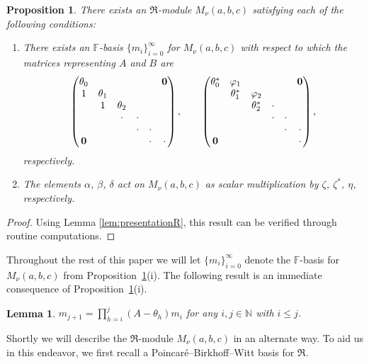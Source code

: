 \documentclass[11pt]{article}
\numberwithin{equation}{section}
\def\N{\mathbb N}
\def\F{\mathbb F}
\numberwithin{equation}{section}
\newtheorem{Lemma}[Theorem]{Lemma}
\newtheorem{Proposition}[Theorem]{Proposition}
 { \theoremstyle{definition}
\newtheorem{Definition}[Theorem]{Definition}
\newtheorem{Example}[Theorem]{Example} }
\begin{document}
\begin{Proposition}\label{prop:Verma}There exists an $\Re$-module $M_\nu (a,b,c)$ satisfying each of the following conditions:
\begin{enumerate}\itemsep=0pt
\item[{\rm (i)}] There exists an $\F$-basis $\{m_i\}_{i=0}^\infty$ for $M_\nu (a,b,c)$ with respect to which the matrices representing $A$ and $B$ are
\begin{gather*}
\begin{pmatrix}
\theta_0 & & & & &{\bf 0}
\\
1 &\theta_1
\\
&1 &\theta_2
 \\
 & &\cdot &\cdot
 \\
& & &\cdot &\cdot
 \\
 {\bf 0} & & & &\cdot &\cdot
\end{pmatrix},
\qquad
\begin{pmatrix}
\theta_0^* &\varphi_1 & & & &{\bf 0}
\\
 &\theta_1^* &\varphi_2
\\
 & &\theta_2^* &\cdot
 \\
 & & &\cdot &\cdot
 \\
& & & &\cdot &\cdot
 \\
 {\bf 0} & & & & &\cdot
\end{pmatrix},
\end{gather*}
respectively.

\item[{\rm (ii)}] The elements $\alpha$, $\beta$, $\delta$ act on $M_\nu (a,b,c)$ as scalar multiplication by $\zeta$, $\zeta^*$, $\eta$, respectively.
\end{enumerate}
\end{Proposition}
\begin{proof}Using Lemma \ref{lem:presentationR}, this result can be verified through routine computations.
\end{proof}

Throughout the rest of this paper we will let $\{m_i\}_{i=0}^\infty$ denote the $\F$-basis for $M_\nu(a,b,c)$ from Proposition~\ref{prop:Verma}(i). The following result is an immediate consequence of Proposition~\ref{prop:Verma}(i).

\begin{Lemma}\label{lem:mi}$m_{j+1}=\prod\limits_{h=i}^j (A-\theta_h)m_i$ for any $i,j\in \N$ with $ i\leq j$.
\end{Lemma}

Shortly we will describe the $\Re$-module $M_\nu(a,b,c)$ in an alternate way. To aid us in this endeavor, we first recall a Poincar\'{e}--Birkhoff--Witt basis for $\Re$.
\end{document}
